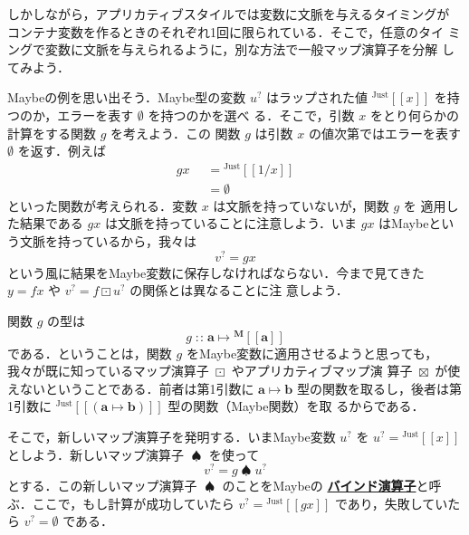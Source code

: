 \documentclass[a5paper,twoside,fleqn,draft]{jsbook}
\newcommand{\TK}[1]{\mask{\textbf{TK:}~#1}{C}}
\def\[{[\![}
\def\]{]\!]}
\newcommand{\keyword}[1]{{\underline{\textbf{#1}}}}
\newcommand{\mKeyword}[1]{\mathsf{#1}}
\newcommand{\mOtherwiseKeyword}{\mKeyword{otherwise}}
\DeclareMathOperator{\mOtherwise}{\mOtherwiseKeyword}
\newcommand{\mNothing}{\emptyset}
\DeclareMathOperator{\mAppMapMaybe}{\boxtimes}
\DeclareMathOperator{\mBindMaybe}{\spadesuit}
\DeclareMathOperator{\mFuncArrow}{\mapsto}
\DeclareMathOperator{\mIn}{{:\!:}}
\DeclareMathOperator{\mMapMaybe}{\boxdot}
\newcommand{\mType}[1]{\mathbf{#1}} %
\newcommand{\mA}{\mType{a}}
\newcommand{\mB}{\mType{b}}
\newcommand{\mTypeAssemble}[2]{{}^\mType{#1}\[\mType{#2}\]}
\newcommand{\mMaybeType}[1]{\mTypeAssemble{M}{#1}}
\newcommand{\mValueConstructor}[1]{\mathrm{#1}}
\newcommand{\mValueWith}[2]{{}^\mValueConstructor{#1}\[#2\]}
\newcommand{\mJustWith}[1]{\mValueWith{Just}{#1}}
\newcommand{\mMaybe}[1]{{#1}^?}
\newcommand{\mGuard}[1]{\mathop{\mid_{#1}}}
\newcommand{\mProjEXP}[2]{#1\mFuncArrow#2} %
\begin{document}
しかしながら，アプリカティブスタイルでは変数に文脈を与えるタイミングが
コンテナ変数を作るときのそれぞれ1回に限られている．そこで，任意のタイ
ミングで変数に文脈を与えられるように，別な方法で一般マップ演算子を分解
してみよう．

Maybeの例を思い出そう．Maybe型の変数 $\mMaybe{u}$ はラップされた値
$\mJustWith{x}$ を持つのか，エラーを表す $\mNothing$ を持つのかを選べ
る．そこで，引数 $x$ をとり何らかの計算をする関数 $g$ を考えよう．この
関数 $g$ は引数 $x$ の値次第ではエラーを表す $\mNothing$ を返す．例えば
\begin{equation}
  \begin{aligned}
    gx&\mGuard{x\neq0}=\mJustWith{1/x}\\
    &\mGuard{\mOtherwise}=\mNothing
  \end{aligned}
\end{equation}
といった関数が考えられる．変数 $x$ は文脈を持っていないが，関数 $g$ を
適用した結果である $gx$ は文脈を持っていることに注意しよう．いま $gx$
はMaybeという文脈を持っているから，我々は
\begin{equation}
\mMaybe{v}=gx
\end{equation}
という風に結果をMaybe変数に保存しなければならない．今まで見てきた
$y=fx$ や $\mMaybe{v}=f\mMapMaybe\mMaybe{u}$ の関係とは異なることに注
意しよう．

\TK{Poor flow.}

関数 $g$ の型は
\begin{equation}
  g\mIn\mProjEXP{\mA }{\mMaybeType{a}}
\end{equation}
である．ということは，関数 $g$ をMaybe変数に適用させるようと思っても，
我々が既に知っているマップ演算子 $\mMapMaybe$ やアプリカティブマップ演
算子 $\mAppMapMaybe$ が使えないということである．前者は第1引数に
$\mProjEXP{\mA }{\mB }$ 型の関数を取るし，後者は第1引数に
$\mJustWith{(\mProjEXP{\mA }{\mB })}$ 型の関数（Maybe関数）を取
るからである．


そこで，新しいマップ演算子を発明する．いまMaybe変数 $\mMaybe{u}$ を
$\mMaybe{u}=\mJustWith{x}$ としよう．新しいマップ演算子 $\mBindMaybe$
を使って
\begin{equation}
  \mMaybe{v}=g\mBindMaybe\mMaybe{u}
\end{equation}
とする．この新しいマップ演算子 $\mBindMaybe$ のことをMaybeの
\keyword{バインド演算子}と呼ぶ．ここで，もし計算が成功していたら
$\mMaybe{v}=\mJustWith{gx}$ であり，失敗していたら
$\mMaybe{v}=\mNothing$ である．
\end{document}
